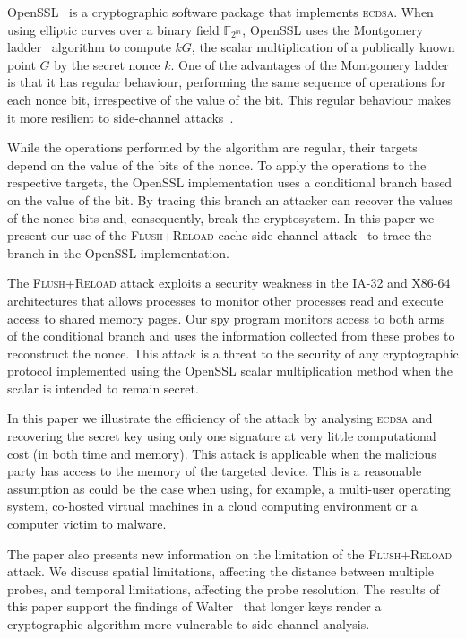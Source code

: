\documentclass[twocolumn]{svjour3}
\begin{document}
OpenSSL~\cite{openssl} is a cryptographic software package that implements \textsc{ecdsa}.
When using elliptic curves over a binary field $\mathbb{F}_{2^m}$, OpenSSL uses the 
Montgomery ladder~\cite{montgomery87speeding,joye03montgomery} algorithm to compute $kG$, the scalar multiplication of a publically known point $G$ by the secret nonce $k$.
One of the advantages of the Montgomery ladder is that it has regular behaviour, performing
the same sequence of operations for each nonce bit, irrespective of the value of the bit.
This regular behaviour makes it more resilient to side-channel attacks~\cite{joye03montgomery,okeya00elliptic}.

While the operations performed by the algorithm are regular, their targets depend on the value of the bits of the nonce.
To apply the operations to the respective targets, the OpenSSL implementation uses a conditional branch based on the value of the bit. By tracing this branch an attacker can recover the values of the nonce bits and, consequently, break the cryptosystem. In this paper we present our use of the \textsc{Flush+Reload} cache side-channel attack~\cite{yarom13flush} to trace the branch in the OpenSSL implementation.

The \textsc{Flush+Reload} attack exploits a security weakness in the IA-32 and X86-64 architectures that allows processes
to monitor other processes read and execute access to shared memory pages.
Our spy program monitors access to both arms of the conditional branch and uses the information
collected from these probes to reconstruct the nonce. This attack is a threat to the security of any cryptographic protocol implemented using the OpenSSL scalar multiplication method when the scalar is intended to remain secret.

In this paper we illustrate the efficiency of the attack by analysing \textsc{ecdsa} and recovering the secret key using only one signature at very little computational cost (in both time and memory). This attack is applicable when the malicious party has access to the memory of the targeted device.
This is  a reasonable assumption as could be the case when using, for example, a multi-user operating system, co-hosted virtual machines in a cloud computing environment or a computer victim to malware. 

The paper also presents new information on the limitation of the \textsc{Flush+Reload} attack.
We discuss spatial limitations, affecting the distance between multiple probes, and 
temporal limitations, affecting the probe resolution.
The results of this paper support the findings of Walter~\cite{walter04longer} that longer keys render a cryptographic algorithm more vulnerable to side-channel analysis.
\end{document}
